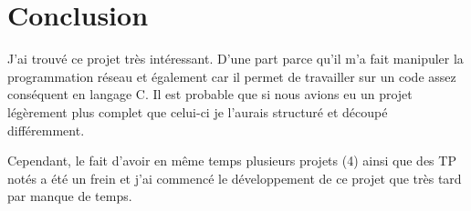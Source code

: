 \chapter{Conclusion}

J'ai trouvé ce projet très intéressant. 
D'une part parce qu'il m'a fait manipuler la programmation réseau et 
également car il permet de travailler 
sur un code assez conséquent en langage C.
Il est probable que si nous avions eu un projet légèrement plus complet
que celui-ci je l'aurais structuré et découpé différemment.

Cependant, le fait d'avoir en même temps plusieurs projets (4) ainsi 
que des TP notés a été un frein et j'ai commencé le développement de 
ce projet que très tard par manque de temps.
